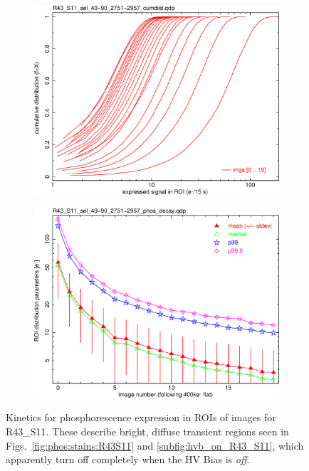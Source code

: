 \begin{figure}[!htbp]
\begin{subfigure}{0.45\textwidth}
  \includegraphics[width=\textwidth]{figures/phosphorescence-survey/phos_kinetics/R43_S11_sel_40-90_2751-2957_cumdist.png}    
\end{subfigure}
\hfil
\begin{subfigure}{0.45\textwidth}
  \centering
  \includegraphics[width=\textwidth]{figures/phosphorescence-survey/phos_kinetics/R43_S11_sel_40-90_2751-2957_phos_decay.png}
\end{subfigure}
\newline
\caption{Kinetics for phosphorescence expression in ROIs of images for R43\_S11. These describe bright, diffuse transient regions seen in Figs.~\ref{fig:phos:stains:R43S11} and \ref{subfig:hvb_on_R43_S11}, which apparently turn off completely when the HV Bias is {\it off}.}
\label{fig:phos:kinetics:R43S11}
\end{figure}

